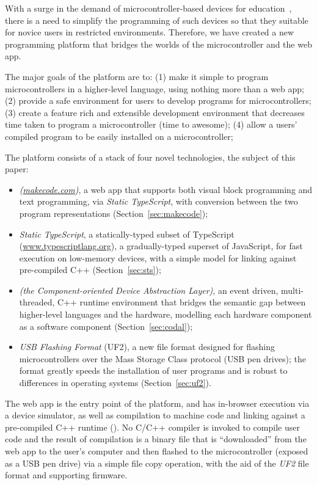With a surge in the demand of microcontroller-based devices for education~\cite{XYZ}, 
there is a need to simplify the programming of such devices so that they suitable 
for novice users in restricted environments.
Therefore, we have created a new programming platform that bridges the worlds of 
the microcontroller and the web app. 

The major goals of the platform are to:
(1) make it simple to program microcontrollers in a higher-level language,
using nothing more than a web app;
(2) provide a safe environment for users to develop programs for microcontrollers;
(3) create a feature rich and extensible development environment that decreases time taken to program a microcontroller (time to awesome);
(4) allow a users' compiled program to be easily installed on a microcontroller;


The platform consists of a stack of four novel technologies, the subject of
this paper:
\begin{itemize}
\item \emph{\MC (\href{https://makecode.com}{makecode.com})}, a web app that supports both visual block programming and text programming,
via \emph{Static TypeScript}, with conversion between the two program representations (Section~\ref{sec:makecode});

\item \emph{Static TypeScript}, a statically-typed subset of TypeScript (\url{www.typescriptlang.org}),
a gradually-typed superset of JavaScript, for fast execution on low-memory devices, with
a simple model for linking against pre-compiled C++ (Section~\ref{sec:sts});

\item \emph{\CO (the Component-oriented Device Abstraction Layer)}, an event driven, multi-threaded, C++ runtime environment that bridges the semantic gap between higher-level languages and the hardware,
modelling each hardware component as a software component (Section~\ref{sec:codal});

\item \emph{USB Flashing Format} (UF2), a new file format designed for flashing microcontrollers 
over the Mass Storage Class protocol (USB pen drives); the format greatly speeds the installation of user
programs and is robust to differences in operating systems (Section~\ref{sec:uf2}).
\end{itemize}
The \MC web app is the entry point of the platform, and has in-browser execution via a device simulator, as well as compilation to machine code and linking against a
pre-compiled C++ runtime (\emph{\CON}). No C/C++ compiler is invoked to compile user code and the result of compilation is a binary file that is ``downloaded'' from the web app to the user's
computer and then flashed to the microcontroller (exposed as a USB pen drive) 
via a simple file copy operation,  with the aid of the \emph{UF2} file format and supporting firmware. 

